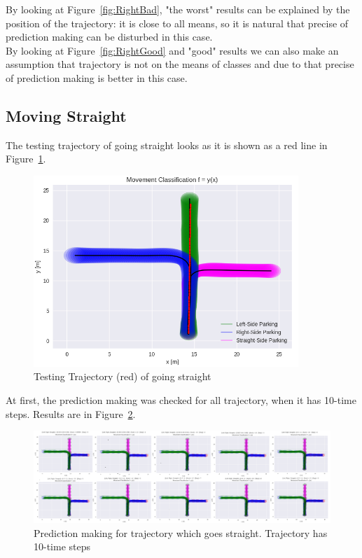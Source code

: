 By looking at Figure~\ref{fig:RightBad}, "the worst" results can be explained by the position of the trajectory: it is close to all means, so it is natural that precise of prediction making can be disturbed in this case. \\
By looking at Figure~\ref{fig:RightGood} and "good" results we can also make an assumption that trajectory is not on the means of classes and due to that precise of prediction making is better in this case. 

\subsection{Moving Straight}

The testing trajectory of going straight looks as it is shown as a red line in Figure~\ref{fig:straight}.

\begin{figure}[H]
	\centering  	
	\includegraphics[width=10cm]{img/straight_org.jpg}
	\caption{Testing Trajectory (red) of going straight}
	\label{fig:straight}    
\end{figure}

At first, the prediction making was checked for all trajectory, when it has 10-time steps. Results are in Figure~\ref{fig:straightPrediction}. 

\begin{figure}[H]
	\centering  	
	\includegraphics[width=18cm]{img/0_prediction_straight.PNG}
	\caption{Prediction making for trajectory which goes straight. Trajectory has 10-time steps}
	\label{fig:straightPrediction}    
\end{figure}

